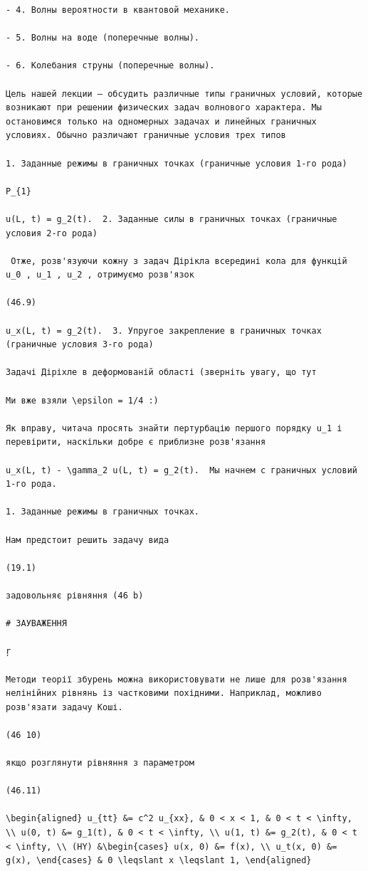 \documentclass[
  ukrainian,
]{article}
\begin{document}
\begin{verbatim}
- 4. Волны вероятности в квантовой механике.

- 5. Волны на воде (поперечные волны).

- 6. Колебания струны (поперечные волны).

Цель нашей лекции — обсудить различные типы граничных условий, которые возникают при решении физических задач волнового характера. Мы остановимся только на одномерных задачах и линейных граничных условиях. Обычно различают граничные условия трех типов

1. Заданные режимы в граничных точках (граничные условия 1-го рода)

P_{1}

u(L, t) = g_2(t).  2. Заданные силы в граничных точках (граничные условия 2-го рода)

 Отже, розв'язуючи кожну з задач Дірікла всередині кола для функцій u_0 , u_1 , u_2 , отримуємо розв'язок

(46.9)

u_x(L, t) = g_2(t).  3. Упругое закрепление в граничных точках (граничные условия 3-го рода)

Задачі Діріхле в деформованій області (зверніть увагу, що тут

Ми вже взяли \epsilon = 1/4 :)

Як вправу, читача просять знайти пертурбацію першого порядку u_1 і перевірити, наскільки добре є приблизне розв'язання

u_x(L, t) - \gamma_2 u(L, t) = g_2(t).  Мы начнем с граничных условий 1-го рода.

1. Заданные режимы в граничных точках.

Нам предстоит решить задачу вида

(19.1)

задовольняє рівняння (46 b)

# ЗАУВАЖЕННЯ

ŗ

Методи теорії збурень можна використовувати не лише для розв'язання нелінійних рівнянь із частковими похідними. Наприклад, можливо розв'язати задачу Коші.

(46 10)

якщо розглянути рівняння з параметром

(46.11)

\begin{aligned} u_{tt} &= c^2 u_{xx}, & 0 < x < 1, & 0 < t < \infty, \\ u(0, t) &= g_1(t), & 0 < t < \infty, \\ u(1, t) &= g_2(t), & 0 < t < \infty, \\ (HY) &\begin{cases} u(x, 0) &= f(x), \\ u_t(x, 0) &= g(x), \end{cases} & 0 \leqslant x \leqslant 1, \end{aligned}


\end{verbatim}
\end{document}
